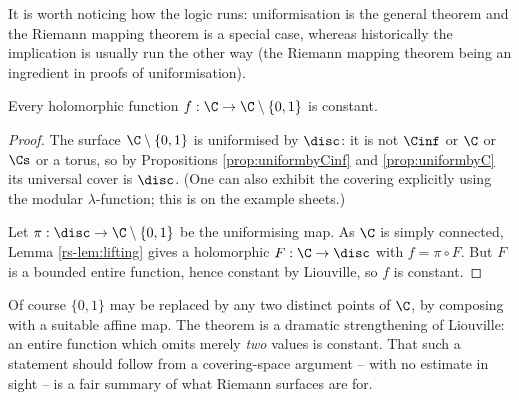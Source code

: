 It is worth noticing how the logic runs: uniformisation is the general theorem and the
Riemann mapping theorem is a special case, whereas historically the implication is
usually run the other way (the Riemann mapping theorem being an ingredient in proofs of
uniformisation).

\begin{theorem}
	Every holomorphic function $f : \C \to \C\setminus\{0,1\}$ is constant.
\end{theorem}

\begin{proof}
	The surface $\C\setminus\{0,1\}$ is uniformised by $\disc$: it is not $\Cinf$ or $\C$
	or $\Cs$ or a torus, so by Propositions \ref{prop:uniformbyCinf} and
	\ref{prop:uniformbyC} its universal cover is $\disc$. (One can also exhibit the covering
	explicitly using the modular $\lambda$-function; this is on the example sheets.)

	Let $\pi : \disc \to \C\setminus\{0,1\}$ be the uniformising map. As $\C$ is simply
	connected, Lemma \ref{rs-lem:lifting} gives a holomorphic $F : \C \to \disc$ with
	$f = \pi\circ F$. But $F$ is a bounded entire function, hence constant by Liouville, so
	$f$ is constant.
\end{proof}

Of course $\{0,1\}$ may be replaced by any two distinct points of $\C$, by composing with
a suitable affine map. The theorem is a dramatic strengthening of Liouville: an entire
function which omits merely \emph{two} values is constant. That such a statement should
follow from a covering-space argument -- with no estimate in sight -- is a fair summary of
what Riemann surfaces are for.

